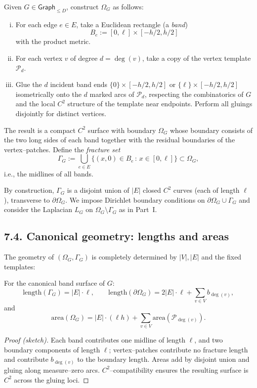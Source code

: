 \begin{definition}
Given $G\in\mathsf{Graph}_{\le D}$, construct $\Omega_G$ as follows:
\begin{enumerate}[(i)]
\item For each edge $e\in E$, take a Euclidean rectangle (a \emph{band})
\[
B_e := [0,\ell]\times[-h/2,h/2]
\]
with the product metric.
\item For each vertex $v$ of degree $d=\deg(v)$, take a copy of the vertex template $\mathcal{P}_d$.
\item Glue the $d$ incident band ends $\{0\}\times[-h/2,h/2]$ or $\{\ell\}\times[-h/2,h/2]$ isometrically onto the $d$ marked arcs of $\mathcal{P}_d$, respecting the combinatorics of $G$ and the local $C^2$ structure of the template near endpoints. Perform all gluings disjointly for distinct vertices.
\end{enumerate}
The result is a compact $C^2$ surface with boundary $\Omega_G$ whose boundary consists of the two long sides of each band together with the residual boundaries of the vertex–patches. Define the \emph{fracture set}
\[
\Gamma_G := \bigcup_{e\in E}\{(x,0)\in B_e \,:\, x\in[0,\ell]\}\subset \Omega_G,
\]
i.e., the midlines of all bands.
\end{definition}

By construction, $\Gamma_G$ is a disjoint union of $|E|$ closed $C^2$ curves (each of length $\ell$), transverse to $\partial\Omega_G$. We impose Dirichlet boundary conditions on $\partial\Omega_G\cup\Gamma_G$ and consider the Laplacian $L_G$ on $\Omega_G\setminus\Gamma_G$ as in Part~I.

\subsection*{7.4. Canonical geometry: lengths and areas}
The geometry of $(\Omega_G,\Gamma_G)$ is completely determined by $|V|,|E|$ and the fixed templates:
\begin{lemma}\label{lem:geo-counts}
For the canonical band surface of $G$:
\[
\mathrm{length}(\Gamma_G)=|E|\cdot \ell,\qquad
\mathrm{length}(\partial\Omega_G)=2|E|\cdot \ell + \sum_{v\in V} b_{\deg(v)},
\]
and
\[
\mathrm{area}(\Omega_G)=|E|\cdot (\ell h) + \sum_{v\in V} \mathrm{area}(\mathcal{P}_{\deg(v)}).
\]
\end{lemma}

\begin{proof}[Proof (sketch)]
Each band contributes one midline of length $\ell$, and two boundary components of length $\ell$; vertex–patches contribute no fracture length and contribute $b_{\deg(v)}$ to the boundary length. Areas add by disjoint union and gluing along measure–zero arcs. $C^2$–compatibility ensures the resulting surface is $C^2$ across the gluing loci.
\end{proof}


